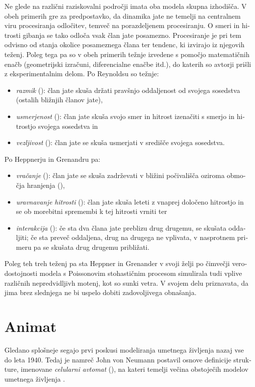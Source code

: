 \begin{slovenian}
Ne glede na različni raziskovalni področji imata oba modela skupna izhodišča. V obeh primerih gre za predpostavko, da dinamika jate ne temelji na centralnem viru procesiranja odločitev, temveč na porazdeljenem procesiranju. O smeri in hitrosti gibanja se tako odloča vsak član jate posamezno. Procesiranje je pri tem odvisno od stanja okolice posameznega člana ter tendenc, ki izvirajo iz njegovih teženj. Poleg tega pa so v obeh primerih težnje izvedene s pomočjo matematičnih enačb (geometrijski izračuni, diferencialne enačbe itd.), do katerih so avtorji prišli z eksperimentalnim delom. Po Reynoldsu \cite{reynolds:1987,reynolds:1999} so težnje:
\begin{itemize}
\item \emph{razmik} (): član jate skuša držati pravšnjo oddaljenost od svojega sosedstva (ostalih bližnjih članov jate), 
\item \emph{usmerjenost} (): član jate skuša svojo smer in hitrost izenačiti s smerjo in hitrostjo svojega sosedstva in 
\item \emph{vezljivost} (): član jate se skuša usmerjati v središče svojega sosedstva.
\end{itemize}
Po Heppnerju in Grenandru \cite{heppner:1990} pa:
\begin{itemize}
\item \emph{vračanje} (): član jate se skuša zadrževati v bližini počivališča oziroma območja hranjenja (),
\item \emph{uravnavanje hitrosti} (): član jate skuša leteti z vnaprej določeno hitrostjo in se ob morebitni spremembi k tej hitrosti vrniti ter
\item \emph{interakcija} (): če sta dva člana jate preblizu drug drugemu, se skušata oddaljiti; če sta preveč oddaljena, drug na drugega ne vplivata, v nasprotnem primeru pa se skušata drug drugemu približati.
\end{itemize}
Poleg teh treh teženj pa sta Heppner in Grenander v svoji želji po čimvečji verodostojnosti modela s Poissonovim stohastičnim procesom simulirala tudi vplive različnih nepredvidljivh motenj, kot so sunki vetra. V svojem delu \cite{heppner:1990} priznavata, da jima brez slednjega ne bi uspelo dobiti zadovoljivega obnašanja.

\section{Animat}
Gledano splošneje segajo prvi poskusi modeliranja umetnega življenja nazaj vse do leta 1940. Tedaj je namreč John von Neumann postavil osnove definicije strukture, imenovane \emph{celularni avtomat} (), na kateri temelji večina obstoječih modelov umetnega življenja \cite{adami:1998,bonabeau:1999,emmenche:1994,gardner:1970,langton:1984,rucker:1993}. 


\end{slovenian}
